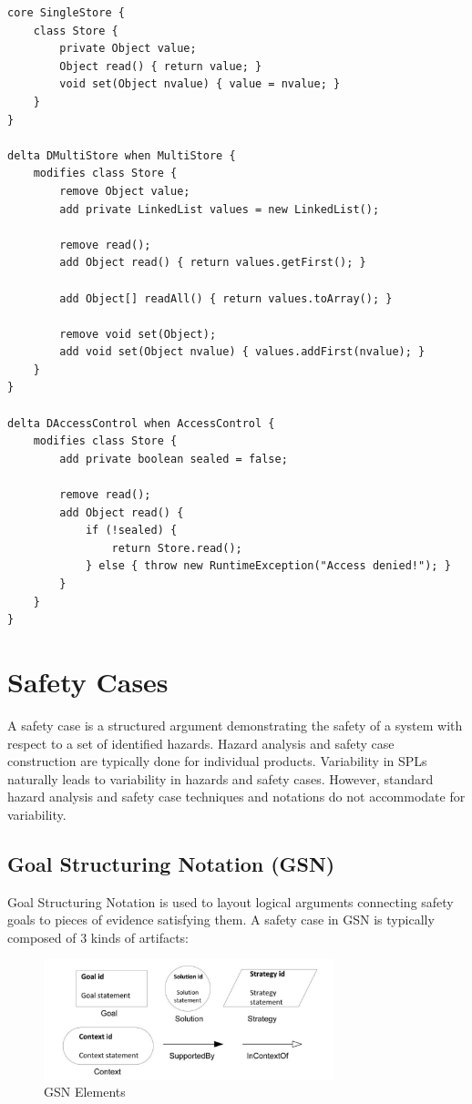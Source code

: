 \documentclass[11pt]{article}
\begin{document}
\begin{lstlisting}[caption=Annotative example, label={lst:Annotative}]
core SingleStore {
	class Store {
		private Object value;
		Object read() { return value; }
		void set(Object nvalue) { value = nvalue; }
	} 
}

delta DMultiStore when MultiStore {
	modifies class Store {
		remove Object value;
		add private LinkedList values = new LinkedList();

		remove read();
		add Object read() { return values.getFirst(); }

		add Object[] readAll() { return values.toArray(); }

		remove void set(Object);
		add void set(Object nvalue) { values.addFirst(nvalue); }
	}
}

delta DAccessControl when AccessControl {
	modifies class Store {
		add private boolean sealed = false;

		remove read();
		add Object read() {
			if (!sealed) {
				return Store.read();
			} else { throw new RuntimeException("Access denied!"); }
		}
	}
}
\end{lstlisting}

\section{Safety Cases}

A safety case is a structured argument demonstrating the safety of a system with respect to a set of identified hazards. Hazard analysis and safety case construction are typically done for individual products. Variability in SPLs naturally leads to variability in hazards and safety cases. However, standard hazard analysis and safety case techniques and notations do not accommodate for variability. 
 
\subsection{Goal Structuring Notation (GSN)}

Goal Structuring Notation is used to layout logical arguments connecting safety goals to pieces of evidence satisfying them. A safety case in GSN is typically composed of 3 kinds of artifacts:

\begin{figure}
  \centering
  \includegraphics[width=0.75\textwidth]{gsn}
  \caption{GSN Elements}
\end{figure}
\end{document}
